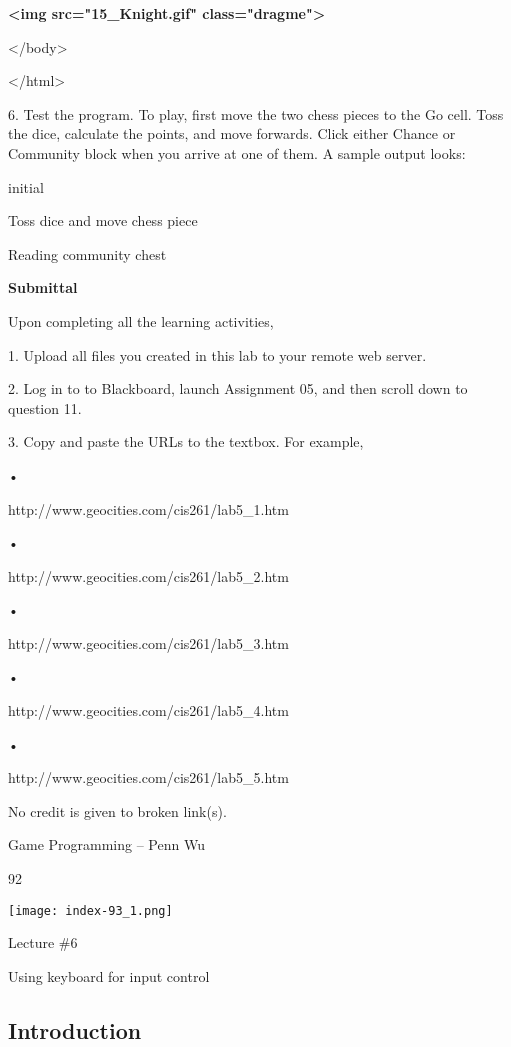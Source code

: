 \documentclass[
]{article}
\begin{document}
\textbf{\textless img src="15\_Knight.gif" class="dragme"\textgreater{}}

\textless/body\textgreater{}

\textless/html\textgreater{}

6. Test the program. To play, first move the two chess pieces to the Go
cell. Toss the dice, calculate the points, and move forwards. Click
either Chance or Community block when you arrive at one of them. A
sample output looks:

initial

Toss dice and move chess piece

Reading community chest

\textbf{Submittal}

Upon completing all the learning activities,

1. Upload all files you created in this lab to your remote web server.

2. Log in to to Blackboard, launch Assignment 05, and then scroll down
to question 11.

3. Copy and paste the URLs to the textbox. For example,

•

http://www.geocities.com/cis261/lab5\_1.htm

•

http://www.geocities.com/cis261/lab5\_2.htm

•

http://www.geocities.com/cis261/lab5\_3.htm

•

http://www.geocities.com/cis261/lab5\_4.htm

•

http://www.geocities.com/cis261/lab5\_5.htm

No credit is given to broken link(s).

Game Programming -- Penn Wu

92

\protect\hypertarget{index_split_006.htmlux5cux23p93}{}{}\texttt{[image: index-93\_1.png]}

Lecture \#6

Using keyboard for input control

\protect\hypertarget{index_split_007.html}{}{}

\hypertarget{index_split_007.htmlux5cux23calibre_pb_6}{%
\subsection{Introduction}\label{index_split_007.htmlux5cux23calibre_pb_6}}
\end{document}
